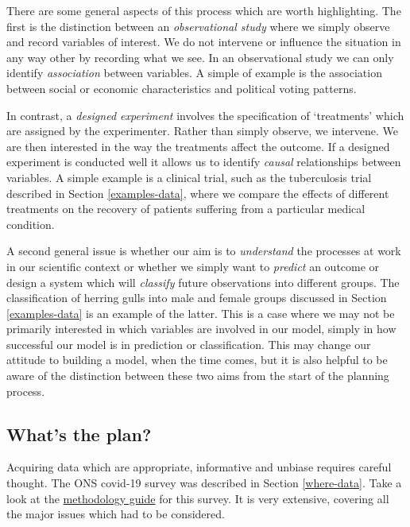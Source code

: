 \documentclass[
]{book}
\begin{document}
There are some general aspects of this process which are worth highlighting. The first is the distinction between an \emph{observational study} where we simply observe and record variables of interest. We do not intervene or influence the situation in any way other by recording what we see. In an observational study we can only identify \emph{association} between variables. A simple of example is the association between social or economic characteristics and political voting patterns.

In contrast, a \emph{designed experiment} involves the specification of `treatments' which are assigned by the experimenter. Rather than simply observe, we intervene. We are then interested in the way the treatments affect the outcome. If a designed experiment is conducted well it allows us to identify \emph{causal} relationships between variables. A simple example is a clinical trial, such as the tuberculosis trial described in Section \ref{examples-data}, where we compare the effects of different treatments on the recovery of patients suffering from a particular medical condition.

A second general issue is whether our aim is to \emph{understand} the processes at work in our scientific context or whether we simply want to \emph{predict} an outcome or design a system which will \emph{classify} future observations into different groups. The classification of herring gulls into male and female groups discussed in Section \ref{examples-data} is an example of the latter. This is a case where we may not be primarily interested in which variables are involved in our model, simply in how successful our model is in prediction or classification. This may change our attitude to building a model, when the time comes, but it is also helpful to be aware of the distinction between these two aims from the start of the planning process.

\subsection{What's the plan?}\label{whats-the-plan}

Acquiring data which are appropriate, informative and unbiase requires careful thought. The ONS covid-19 survey was described in Section \ref{where-data}. Take a look at the \href{https://www.ons.gov.uk/peoplepopulationandcommunity/healthandsocialcare/conditionsanddiseases/methodologies/covid19infectionsurveypilotmethodsandfurtherinformation}{methodology guide} for this survey. It is very extensive, covering all the major issues which had to be considered.
\end{document}
